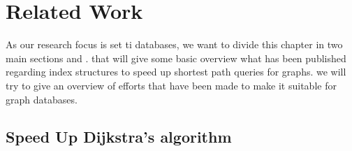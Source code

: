 \chapter{Related Work} 

As our research focus is set ti databases, we want to divide this chapter in two main sections  and .
 that will give some basic overview what has been published regarding index structures to speed up shortest path queries for graphs.
 we will try to give an overview of efforts that have been made to make \cite[Customizable Contraction Hierarchies]{CCH} it suitable for graph databases.

\section{Speed Up Dijkstra's algorithm} \label{sec:algorithmic_history}

